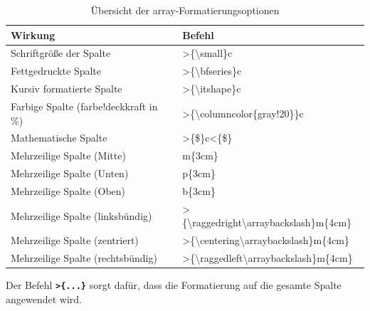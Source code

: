 \begin{table}[h]
    \centering
    \renewcommand{\arraystretch}{1.3} %
    \setlength{\tabcolsep}{8pt} %
    \begin{tabular}{l|l}
        \toprule
        \textbf{Wirkung}                       & \textbf{Befehl}                                                      \\
        \midrule
        Schriftgröße der Spalte                & >\{\textbackslash small\}c                                           \\
        Fettgedruckte Spalte                   & >\{\textbackslash bfseries\}c                                        \\
        Kursiv formatierte Spalte              & >\{\textbackslash itshape\}c                                         \\
        Farbige Spalte (farbe!deckkraft in \%) & >\{\textbackslash columncolor\{gray!20\}\}c                          \\
        Mathematische Spalte                   & >\{\$\}c<\{\$\}                                                      \\
        \midrule
        Mehrzeilige Spalte (Mitte)             & m\{3cm\}                                                             \\
        Mehrzeilige Spalte (Unten)             & p\{3cm\}                                                             \\
        Mehrzeilige Spalte (Oben)              & b\{3cm\}                                                             \\
        Mehrzeilige Spalte (linksbündig)       & >\{\textbackslash raggedright\textbackslash arraybackslash\}m\{4cm\} \\
        Mehrzeilige Spalte (zentriert)         & >\{\textbackslash centering\textbackslash arraybackslash\}m\{4cm\}   \\
        Mehrzeilige Spalte (rechtsbündig)      & >\{\textbackslash raggedleft\textbackslash arraybackslash\}m\{4cm\}  \\
        \bottomrule
    \end{tabular}
    \caption{Übersicht der array-Formatierungsoptionen}
    \label{tab:array_formatierungen}
\end{table}

Der Befehl \textbf{\texttt{>\{...\}}} sorgt dafür, dass die Formatierung auf die gesamte Spalte angewendet wird.

